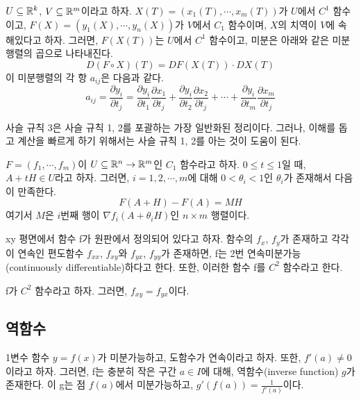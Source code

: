 \begin{theorem}
$U \subseteq \mathbb{R}^k$, $V \subseteq \mathbb{R}^m$이라고 하자. $X(T)=(x_1(T),\cdots,x_m(T))$가 $U$에서 $C^1$ 함수이고, $F(X)=(y_1(X),\cdots,y_n(X))$가 $V$에서 $C_1$ 함수이며, $X$의 치역이 $V$에 속해있다고 하자. 그러면, $F(X(T))$는 $U$에서 $C^1$ 함수이고, 미분은 아래와 같은 미분행렬의 곱으로 나타내진다.
$$
D(F\circ X)(T) = DF(X(T))\cdot DX(T)
$$
이 미분행렬의 각 항 $a_{ij}$은 다음과 같다.
$$
a_{ij} = \frac{\partial y_i}{\partial t_j} = \frac{\partial y_i}{\partial t_1}\frac{\partial x_1}{\partial t_j} + \frac{\partial y_i}{\partial t_2}\frac{\partial x_2}{\partial t_j} + \cdots + \frac{\partial y_i}{\partial t_m}\frac{\partial x_m}{\partial t_j}
$$
\end{theorem}

사슬 규칙 3은 사슬 규칙 1, 2를 포괄하는 가장 일반화된 정리이다. 그러나, 이해를 돕고 계산을 빠르게 하기 위해서는 사슬 규칙 1, 2를 아는 것이 도움이 된다.

\begin{theorem}
$F=(f_1,\cdots,f_m)$이 $U \subseteq \mathbb{R}^n \to \mathbb{R}^m$인 $C_1$ 함수라고 하자. $0 \leq t \leq 1$일 때, $A+tH \in U$라고 하자. 그러면, $i=1,2,\cdots,m$에 대해 $0 < \theta_i < 1$인 $\theta_i$가 존재해서 다음이 만족한다.
$$
F(A+H)-F(A)=MH
$$
여기서 $M$은 $i$번째 행이 $\nabla f_i (A+\theta_i H)$인 $n \times m$ 행렬이다.
\end{theorem}

\begin{definition}[2번 연속미분]
xy 평면에서 함수 f가 원판에서 정의되어 있다고 하자. 함수의 $f_x$, $f_y$가 존재하고 각각이 연속인 편도함수 $f_{xx}$, $f_{xy}$와 $f_{yx}$, $f_{yy}$가 존재하면, f는 2번 연속미분가능(continuously differentiable)하다고 한다. 또한, 이러한 함수 f를 $C^2$ 함수라고 한다.
\end{definition}

\begin{theorem}
f가 $C^2$ 함수라고 하자. 그러면, $f_{xy}=f_{yx}$이다.
\end{theorem}

\subsection{역함수}
1변수 함수 $y=f(x)$가 미분가능하고, 도함수가 연속이라고 하자. 또한, $f'(a) \neq 0$이라고 하자. 그러면, f는 충분히 작은 구간 $a \in I$에 대해, 역함수(inverse function) $g$가 존재한다. 이 g는 점 $f(a)$에서 미분가능하고, $g ' (f(a))= \frac{1}{f'(a)}$이다.

